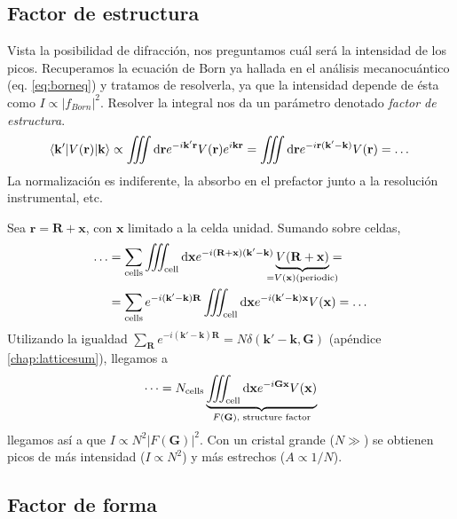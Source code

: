 \subsection{Factor de estructura}
Vista la posibilidad de difracción, nos preguntamos cuál será la intensidad de
los picos. Recuperamos la ecuación de Born ya hallada en el análisis
mecanocuántico (eq. \ref{eq:borneq}) y tratamos de resolverla, ya que la
intensidad depende de ésta como $I \propto \vert f_{Born} \vert^2 $.
Resolver la integral nos da un parámetro denotado \emph{factor de
estructura}.
\begin{equation}
  \langle  \mathbf{k}' \vert V(\mathbf{r}) \vert \mathbf{k} \rangle \propto \myiiint \text{d}\mathbf{r} e ^{-i\mathbf{k'}\mathbf{r}} V(\mathbf{r})e ^{i\mathbf{k}\mathbf{r}} = \myiiint \text{d}\mathbf{r} e ^{-i \mathbf{r} (\mathbf{k'}-\mathbf{k})} V(\mathbf{r}) = \dots
\end{equation}
La normalización es indiferente, la absorbo en el prefactor junto a la resolución instrumental, etc.

Sea $\mathbf{r} = \mathbf{R}+\mathbf{x}$, con $\mathbf{x}$ limitado a la celda
unidad. Sumando sobre celdas,
\begin{equation}
\begin{split}
  \label{eq:samplitude}
  \dots &= \sum_{\text{cells}} \myiiint_{\text{cell}} \text{d}\mathbf{x} e ^{-i(\mathbf{R}+\mathbf{x})(\mathbf{k'}-\mathbf{k})} \underbrace{V(\mathbf{R}+\mathbf{x})}_{\mathclap{=V(\mathbf{x}) \text{(periodic)}}} =\\ &= \sum_{\text{cells}} e ^{-i (\mathbf{k'}-\mathbf{k})\mathbf{R}} \myiiint_{\text{cell}} \text{d}\mathbf{x} e ^{-i (\mathbf{k'}-\mathbf{k})\mathbf{x}} V(\mathbf{x}) = \dots
\end{split}
\end{equation}
Utilizando la igualdad $\sum_\mathbf{R}
e^{-i(\mathbf{k'}-\mathbf{k})\mathbf{R}}=N
{\delta(\mathbf{k'}-\mathbf{k},\mathbf{G})}$ (apéndice \ref{chap:latticesum}), llegamos a 
\begin{equation}
  \dots = N_{\text{cells}} \underbrace{\myiiint_{\text{cell}} \text{d}\mathbf{x} e ^{-i\mathbf{G}\mathbf{x}} V(\mathbf{x})
}_{\mathclap{F(\mathbf{G})\text{, structure factor}}}
\end{equation}
llegamos así a que $I \propto N^2 \vert F(\mathbf{G})\vert^2$. Con un cristal
grande ($N \gg$) se obtienen picos de más intensidad ($I \propto N^2$) y más
estrechos ($A \propto 1/N$). 

\subsection{Factor de forma}
\label{subsec:formfactor}

